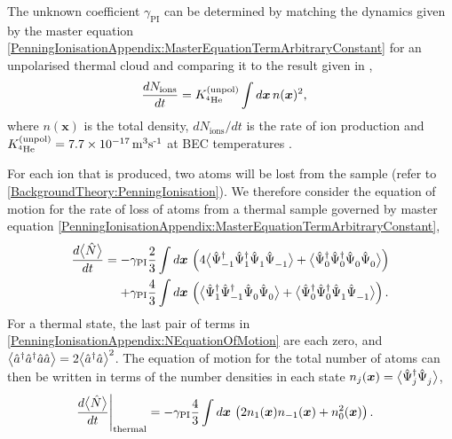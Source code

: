 The unknown coefficient $\gamma_\text{PI}$ can be determined by matching the dynamics given by the master equation \eqref{PenningIonisationAppendix:MasterEquationTermArbitraryConstant} for an unpolarised thermal cloud and comparing it to the result given in \citep{Stas:2006kx},
\begin{align}
    \frac{d N_\text{ions}}{d t} &= \Kunpol \int d \bm{x}\, n(\bm{x})^2,
    \label{PenningIonisationAppendix:ThermalSampleStas}
\end{align}
where $n(\bm{x})$ is the total density, $dN_\text{ions}/dt$ is the rate of ion production and $\Kunpol = \unit[7.7 \times 10^{-17}]{m\textsuperscript{3}s\textsuperscript{-1}}$ at BEC temperatures \citep{Stas:2006kx}.

For each ion that is produced, two atoms will be lost from the sample (refer to \eqref{BackgroundTheory:PenningIonisation}). We therefore consider the equation of motion for the rate of loss of atoms from a thermal sample governed by master equation \eqref{PenningIonisationAppendix:MasterEquationTermArbitraryConstant},
\begin{align}
    \label{PenningIonisationAppendix:NEquationOfMotion}
    \begin{split}
        \frac{d \mean{\hat{N}}}{d t} &= - \gamma_\text{PI} \frac{2}{3}\int d \bm{x}\, \left(4 \mean{\hat{\Psi}_{-1}^\dagger \hat{\Psi}_1^\dagger \hat{\Psi}_1^{\phantom{\dagger}}\hat{\Psi}_{-1}^{\phantom{\dagger}}} + \mean{\hat{\Psi}_0^\dagger \hat{\Psi}_0^\dagger \hat{\Psi}_0^{\phantom{\dagger}} \hat{\Psi}_0^{\phantom{\dagger}}}\right)\\
        &\relphantom{=} + \gamma_\text{PI} \frac{4}{3}\int d \bm{x}\, \left( \mean{\hat{\Psi}_1^\dagger \hat{\Psi}_{-1}^\dagger \hat{\Psi}_0^{\phantom{\dagger}} \hat{\Psi}_0^{\phantom{\dagger}}} +  \mean{\hat{\Psi}_0^\dagger \hat{\Psi}_0^\dagger \hat{\Psi}_1^{\phantom{\dagger}} \hat{\Psi}_{-1}^{\phantom{\dagger}}} \right).
    \end{split}
\end{align}
For a thermal state, the last pair of terms in \eqref{PenningIonisationAppendix:NEquationOfMotion} are each zero, and ${\big<\hat{a}^\dagger \hat{a}^\dagger \hat{a} \hat{a}\big>} = 2 {\big<\hat{a}^\dagger \hat{a}\big>}^2$. The equation of motion for the total number of atoms can then be written in terms of the number densities in each state $n_j(\bm{x}) = {\big<\hat{\Psi}_j^\dagger \hat{\Psi}_j^{\phantom{\dagger}}\big>}$,
\begin{align}
    \left.\frac{d {\big<\hat{N}\big>}}{dt} \right|_\text{thermal} &= - \gamma_\text{PI} \frac{4}{3} \int d \bm{x}\, \left(2 n_1(\bm{x}) n_{-1}(\bm{x}) + n_0^2(\bm{x})\right).
\end{align}

